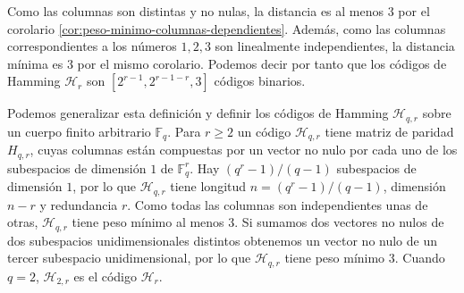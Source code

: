 Como las columnas son distintas y no nulas, la distancia es al menos \(3\) por el corolario \ref{cor:peso-minimo-columnas-dependientes}.
Además, como las columnas correspondientes a los números \(1, 2, 3\) son linealmente independientes, la distancia mínima es 3 por el mismo corolario.
Podemos decir por tanto que los códigos de Hamming \(\mathcal H_r\) son \([2^{r-1}, 2^{r-1-r}, 3]\) códigos binarios.

Podemos generalizar esta definición y definir los códigos de Hamming \(\mathcal H_{q,r}\) sobre un cuerpo finito arbitrario \(\mathbb F_q\). 
Para \(r \geq 2\) un código \(\mathcal H_{q,r}\) tiene matriz de paridad \(H_{q,r}\), cuyas columnas están compuestas por un vector no nulo por cada uno de los subespacios de dimensión \(1\) de \(\mathbb F_q^r\).
Hay \((q^r-1)/(q-1)\) subespacios de dimensión \(1\), por lo que \(\mathcal H_{q,r}\) tiene longitud \(n = (q^r-1)/(q-1)\), dimensión \(n-r\) y redundancia \(r\).
Como todas las columnas son independientes unas de otras, \(\mathcal H_{q,r}\) tiene peso mínimo al menos 3.
Si sumamos dos vectores no nulos de dos subespacios unidimensionales distintos obtenemos un vector no nulo de un tercer subespacio unidimensional, por lo que \(\mathcal H_{q,r}\) tiene peso mínimo 3. 
Cuando \(q = 2\), \(\mathcal H_{2,r}\) es el código \(\mathcal H_r\).

